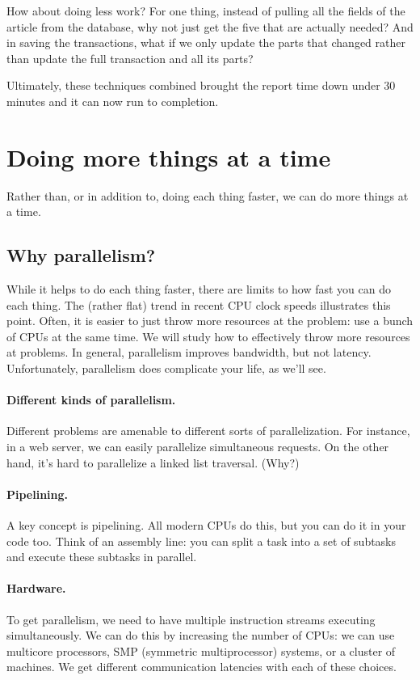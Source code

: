 How about doing less work? For one thing, instead of pulling all the fields of the article from the database, why not just get the five that are actually needed? And in saving the transactions, what if we only update the parts that changed rather than update the full transaction and all its parts?

Ultimately, these techniques combined brought the report time down under 30 minutes and it can now run to completion. 

\section*{Doing more things at a time} 
Rather than, or in addition to, doing each thing faster, we can do
more things at a time.

\subsection*{Why parallelism?}
While it helps to do each thing faster, there are limits to how fast
you can do each thing. The (rather flat) trend in recent CPU clock
speeds illustrates this point. Often, it is easier to just throw more
resources at the problem: use a bunch of CPUs at the same time. We
will study how to effectively throw more resources at problems.
In general, parallelism improves bandwidth, but not latency.
Unfortunately, parallelism does complicate your life, as we'll see.

\paragraph{Different kinds of parallelism.} Different problems are amenable
to different sorts of parallelization. For instance, in a web server, we
can easily parallelize simultaneous requests. On the other hand, it's hard
to parallelize a linked list traversal. (Why?)

\paragraph{Pipelining.} A key concept is pipelining. All modern CPUs do this,
but you can do it in your code too. Think of an assembly line: you can split
a task into a set of subtasks and execute these subtasks in parallel.

\paragraph{Hardware.} To get parallelism, we need to have multiple instruction
streams executing simultaneously. We can do this by increasing the
number of CPUs: we can use multicore processors, SMP (symmetric
multiprocessor) systems, or a cluster of machines. We get different
communication latencies with each of these choices.

